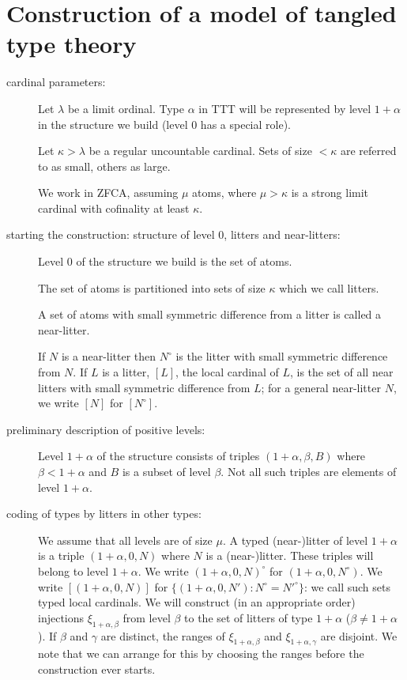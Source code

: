 \documentclass[12pt]{article}
\begin{document}
\newpage

\section{Construction of a model of tangled type theory}
\begin{description}

\item[cardinal parameters:]  Let $\lambda$ be a limit ordinal.  Type $\alpha$ in TTT will be represented by level $1+\alpha$ in the structure we build (level 0 has a special role).

Let $\kappa>\lambda$ be a regular uncountable cardinal.  Sets of size $<\kappa$ are referred to as small, others as large.

We work in ZFCA, assuming $\mu$ atoms, where $\mu >\kappa$ is a strong limit cardinal with cofinality at least $\kappa$.

\item[starting the construction:  structure of level 0, litters and near-litters:]

Level 0 of the structure we build is the set of atoms.

The set of atoms is  partitioned into sets of size $\kappa$ which we call litters.

A set of atoms with small symmetric difference from a litter is called a near-litter.  

If $N$ is a near-litter then $N^{\circ}$ is the litter with small symmetric difference from $N$.
If $L$ is a litter, $[L]$, the local cardinal of $L$, is the set of all near litters with small symmetric difference from $L$;  for a general near-litter $N$, we write $[N]$ for $[N^\circ]$.

\item[preliminary description of positive levels:]

Level $1+\alpha$ of the structure consists of triples $(1+\alpha,\beta,B)$ where $\beta <1+\alpha$ and $B$ is a subset of level $\beta$.  Not all such triples are elements
of level $1+\alpha$.

\item[coding of types by litters in other types:]

We assume that all levels are of size $\mu$.  A typed (near-)litter of level $1+\alpha$ is a triple $(1+\alpha,0,N)$ where $N$ is a (near-)litter.  These triples will belong to level $1+\alpha$.  We write $(1+\alpha,0,N)^{\circ}$ for
$(1+\alpha,0,N^{\circ})$.  We write $[(1+\alpha,0,N)]$ for $\{(1+\alpha,0,N'):N^\circ = N'^\circ\}$:  we call such sets typed local cardinals.  We will construct (in an appropriate order) injections $\xi_{1+\alpha,\beta}$ from level $\beta$ to the set of litters of type $1+\alpha$ ($\beta \neq 1+\alpha$).  If $\beta$ and $\gamma$ are distinct, the ranges of $\xi_{1+\alpha,\beta}$ and $\xi_{1+\alpha,\gamma}$ are disjoint.  We note that we can arrange for this by choosing the ranges before the construction
ever starts.


\end{description}
\end{document}
